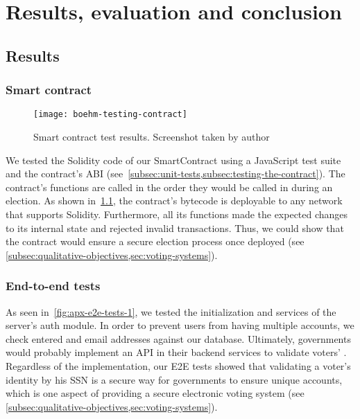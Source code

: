 \chapter{Results, evaluation and conclusion}\label{ch:results-evaluation-conclusion}

\section{Results}\label{sec:results}

\subsection{Smart contract}\label{subsec:res-smart-contract}

\begin{figure}[H]
    \centering
    \texttt{[image: boehm-testing-contract]}
    \caption[Smart contract test results]{Smart contract test results. Screenshot taken by author}
    \label{fig:smart-contract-test-results}
\end{figure}

We tested the Solidity code of our \gls{SmartContract} using a JavaScript test suite and the contract's \gls{ABI} (see~\cref{subsec:unit-tests,subsec:testing-the-contract}).
The contract's functions are called in the order they would be called in during an election.
As shown in~\cref{fig:smart-contract-test-results}, the contract's bytecode is deployable to any network that supports Solidity.
Furthermore, all its functions made the expected changes to its internal state and rejected invalid transactions.
Thus, we could show that the contract would ensure a secure election process once deployed (see \cref{subsec:qualitative-objectives,sec:voting-systems}).

\subsection{End-to-end tests}\label{subsec:res-end-to-end-tests}

As seen in~\cref{fig:apx-e2e-tests-1}, we tested the initialization and services of the server's auth module.
In order to prevent users from having multiple accounts, we check entered  and email addresses against our database.
Ultimately, governments would probably implement an \gls{API} in their backend services to validate voters' .
Regardless of the implementation, our \gls{E2E} tests showed that validating a voter's identity by his \gls{SSN} is a secure way for governments to ensure unique accounts, which is one aspect of providing a secure electronic voting system (see \cref{subsec:qualitative-objectives,sec:voting-systems}).

